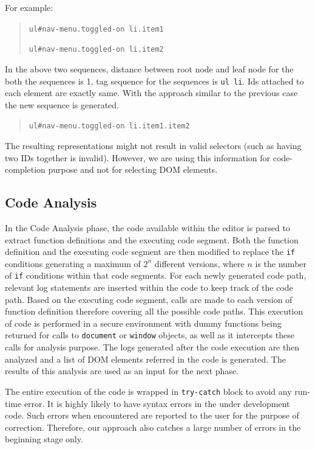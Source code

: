 \begin{description}
			For example:
			\begin{quote}
				\texttt{ul\#nav-menu.toggled-on li.item1}
	
				\texttt{ul\#nav-menu.toggled-on li.item2}
			\end{quote}

			In the above two sequences, distance between root node and leaf node for the both the sequences is 1, tag sequence for the sequences is \texttt{ul li}. Ids attached to each element are exactly same. With the approach similar to the previous case the new sequence is generated.

			\begin{quote}
				\texttt{ul\#nav-menu.toggled-on li.item1.item2}
			\end{quote}
			
			The resulting \css representations might not result in valid \css selectors (such as having two IDs together is invalid). However, we are using this information for code-completion purpose and not for selecting DOM elements.
		
		\end{description}
	
	\subsection{Code Analysis}
	\label{Sec:Code-Analysis}
		
		In the Code Analysis phase, the \javascript code available within the editor is parsed to extract function definitions and the executing code segment. Both the function definition and the executing code segment are then modified to replace the \texttt{if} conditions generating a maximum of $2^n$ different versions, where $n$ is the number of \texttt{if} conditions within that code segments. For each newly generated code path, relevant log statements are inserted within the code to keep track of the code path. Based on the executing code segment, calls are made to each version of function definition therefore covering all the possible code paths. This execution of \javascript code is performed in a secure environment with dummy functions being returned for calls to \texttt{document} or \texttt{window} objects, as well as it intercepts these calls for analysis purpose. The logs generated after the code execution are then analyzed and a list of DOM elements referred in the code is generated. The results of this analysis are used as an input for the next phase.
		
		The entire execution of the code is wrapped in \texttt{try-catch} block to avoid any run-time error. It is highly likely to have syntax errors in the under development code. Such errors when encountered are reported to the user for the purpose of correction. Therefore, our approach also catches a large number of errors in the beginning stage only.
		
